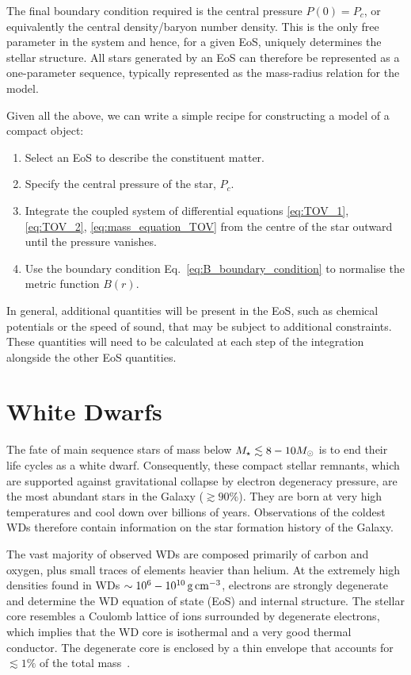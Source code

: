 The final boundary condition required is the central pressure $P(0) = P_c$, or equivalently the central density/baryon number density. This is the only free parameter in the system and hence, for a given EoS, uniquely determines the stellar structure. All stars generated by an EoS can therefore be represented as a one-parameter sequence, typically represented as the mass-radius relation for the model. 

Given all the above, we can write a simple recipe for constructing a model of a compact object:
\begin{enumerate}
    \item Select an EoS to describe the constituent matter.
    \item Specify the central pressure of the star, $P_c$.
    \item Integrate the coupled system of differential equations \ref{eq:TOV_1}, \ref{eq:TOV_2}, \ref{eq:mass_equation_TOV} from the centre of the star outward until the pressure vanishes.
    \item Use the boundary condition Eq.~\ref{eq:B_boundary_condition} to normalise the metric function $B(r)$. 
\end{enumerate}
In general, additional quantities will be present in the EoS, such as chemical potentials or the speed of sound, that may be subject to additional constraints. These quantities will need to be calculated at each step of the integration alongside the other EoS quantities. 

\section{White Dwarfs}

The fate of main sequence stars of mass below $M_\star \lesssim 8 - 10 M_\odot$ is to end their life cycles as a white dwarf. Consequently, these compact stellar remnants, which are supported against gravitational collapse by electron degeneracy pressure, are the most abundant stars in the Galaxy ($\gtrsim 90\%$). They are born at very high temperatures and cool down over billions of years. Observations of the coldest WDs therefore contain information on the star formation history of the Galaxy.

The vast majority of observed WDs are composed primarily of carbon and oxygen, plus small traces of elements heavier than helium. 
At the extremely high densities found in WDs $\sim10^6-10^{10}{\rm \,g}{\rm \,cm}^{-3}$, electrons are strongly degenerate and determine the WD equation of state (EoS) and internal structure.  The stellar core resembles a Coulomb lattice of ions surrounded by degenerate electrons, which implies that the WD core is isothermal and a very good thermal conductor. 
The degenerate core is enclosed by a thin envelope that accounts for $\lesssim 1\%$  of the total mass~\cite{Fontaine_apr_Potentialwhitedwarf}. 

